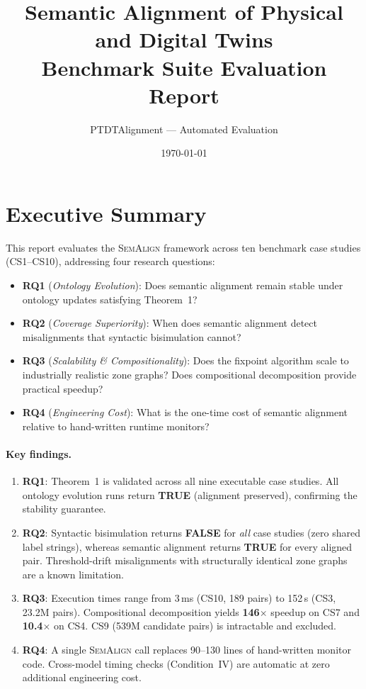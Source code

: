 \documentclass[10pt,a4paper]{article}
\title{\textbf{Semantic Alignment of Physical and Digital Twins}\\
       \large Benchmark Suite Evaluation Report}
\author{PTDTAlignment — Automated Evaluation}
\date{\today}
\newcommand{\OK}{\textcolor{okgreen}{\textbf{TRUE}}}
\newcommand{\FAIL}{\textcolor{warnred}{\textbf{FALSE}}}
\newcommand{\tool}{\textsc{SemAlign}}
\begin{document}
\maketitle
\tableofcontents
\clearpage

\section{Executive Summary}

This report evaluates the \tool{} framework across ten benchmark case studies
(CS1--CS10), addressing four research questions:

\begin{itemize}
  \item \textbf{RQ1} (\emph{Ontology Evolution}): Does semantic alignment
        remain stable under ontology updates satisfying Theorem~1?
  \item \textbf{RQ2} (\emph{Coverage Superiority}): When does semantic alignment
        detect misalignments that syntactic bisimulation cannot?
  \item \textbf{RQ3} (\emph{Scalability \& Compositionality}): Does the
        fixpoint algorithm scale to industrially realistic zone graphs?
        Does compositional decomposition provide practical speedup?
  \item \textbf{RQ4} (\emph{Engineering Cost}): What is the one-time cost of
        semantic alignment relative to hand-written runtime monitors?
\end{itemize}

\paragraph{Key findings.}
\begin{enumerate}
  \item \textbf{RQ1}: Theorem~1 is validated across all nine executable
        case studies. All ontology evolution runs return \OK{} (alignment
        preserved), confirming the stability guarantee.
  \item \textbf{RQ2}: Syntactic bisimulation returns \FAIL{} for \emph{all}
        case studies (zero shared label strings), whereas semantic alignment
        returns \OK{} for every aligned pair. Threshold-drift misalignments
        with structurally identical zone graphs are a known limitation.
  \item \textbf{RQ3}: Execution times range from 3\,ms (CS10, 189 pairs)
        to 152\,s (CS3, 23.2M pairs). Compositional decomposition yields
        \textbf{146$\times$} speedup on CS7 and \textbf{10.4$\times$} on CS4.
        CS9 (539M candidate pairs) is intractable and excluded.
  \item \textbf{RQ4}: A single \tool{} call replaces 90--130 lines of
        hand-written monitor code. Cross-model timing checks (Condition~IV)
        are automatic at zero additional engineering cost.
\end{enumerate}
\end{document}
